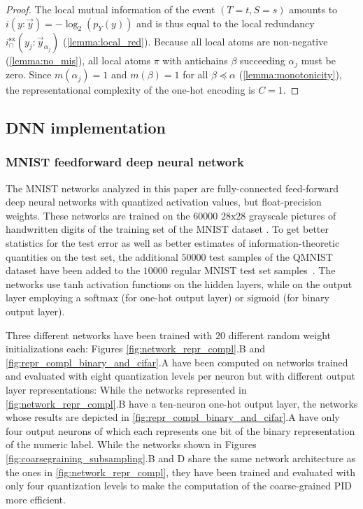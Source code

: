 \documentclass[10pt]{article}
\renewcommand\autoref[1]{\cref{#1}}
\theoremstyle{definition}
\theoremstyle{plain}
\begin{document}
\begin{proof}
The local mutual information of the event $(T=t, S=s)$ amounts to $i(y: \vec{y}) = - \log_2(p_{Y}(y))$ and is thus equal to the local redundancy $i_\cap^{\mathrm{sx}}(y_j:\vec{y}_{\alpha_j})$ (\autoref{lemma:local_red}). Because all local atoms are non-negative (\autoref{lemma:no_mis}), all local atoms $\pi$ with antichains $\beta$ succeeding $\alpha_j$ must be zero. Since $m(\alpha_j) = 1$ and $m(\beta) = 1$ for all $\beta \preceq \alpha$ (\autoref{lemma:monotonicity}), the representational complexity of the one-hot encoding is $C = 1$.
\end{proof}
\subsection{DNN implementation}
\label{apx:implementation}

\subsubsection{MNIST feedforward deep neural network}

The MNIST networks analyzed in this paper are fully-connected feed-forward deep neural networks with quantized activation values, but float-precision weights. These networks are trained on the $60000$ $28\mathrm{x}28$ grayscale pictures of handwritten digits of the training set of the MNIST dataset \citep{lecun_gradient-based_1998}. To get better statistics for the test error as well as better estimates of information-theoretic quantities on the test set, the additional $50000$ test samples of the QMNIST dataset have been added to the $10000$ regular MNIST test set samples~\citep{yadav_cold_2019}. The networks use $\mathrm{tanh}$ activation functions on the hidden layers, while on the output layer employing a $\mathrm{softmax}$ (for one-hot output layer) or $\mathrm{sigmoid}$ (for binary output layer).

Three different networks have been trained with $20$ different random weight initializations each: Figures \ref{fig:network_repr_compl}.B and \ref{fig:repr_compl_binary_and_cifar}.A have been computed on networks trained and evaluated with eight quantization levels per neuron but with different output layer representations: While the networks represented in \autoref{fig:network_repr_compl}.B have a ten-neuron one-hot output layer, the networks whose results are depicted in \autoref{fig:repr_compl_binary_and_cifar}.A have only four output neurons of which each represents one bit of the binary representation of the numeric label. While the networks shown in Figures \ref{fig:coarsegraining_subsampling}.B and D share the same network architecture as the ones in \autoref{fig:network_repr_compl}, they have been trained and evaluated with only four quantization levels to make the computation of the coarse-grained PID more efficient.
\end{document}
